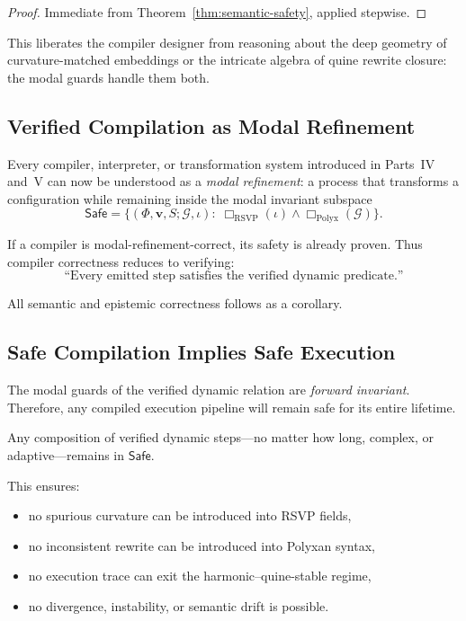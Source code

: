 \begin{proof}
Immediate from Theorem~\ref{thm:semantic-safety}, applied stepwise.
\end{proof}

This liberates the compiler designer from reasoning about the deep
geometry of curvature-matched embeddings or the intricate algebra of
quine rewrite closure: the modal guards handle them both.

\subsection{Verified Compilation as Modal Refinement}

Every compiler, interpreter, or transformation system introduced in
Parts~IV and~V can now be understood as a \emph{modal refinement}:
a process that transforms a configuration while remaining inside the
modal invariant subspace
\[
\mathsf{Safe}
=
\{
(\Phi,\mathbf{v},S;\mathcal{G},\iota)
:\;
\Box_{\mathrm{RSVP}}(\iota)
\land
\Box_{\mathrm{Polyx}}(\mathcal{G})
\}.
\]

If a compiler is modal-refinement-correct, its safety is already proven.
Thus compiler correctness reduces to verifying:
\[
\text{``Every emitted step satisfies the verified dynamic predicate.''}
\]

All semantic and epistemic correctness follows as a corollary.

\subsection{Safe Compilation Implies Safe Execution}

The modal guards of the verified dynamic relation are \emph{forward
invariant}.  
Therefore, any compiled execution pipeline will remain safe for its
entire lifetime.

\begin{corollary}
Any composition of verified dynamic steps---no matter how long, complex,
or adaptive---remains in $\mathsf{Safe}$.
\end{corollary}

This ensures:

\begin{itemize}
\item no spurious curvature can be introduced into RSVP fields,
\item no inconsistent rewrite can be introduced into Polyxan syntax,
\item no execution trace can exit the harmonic–quine-stable regime,
\item no divergence, instability, or semantic drift is possible.
\end{itemize}

